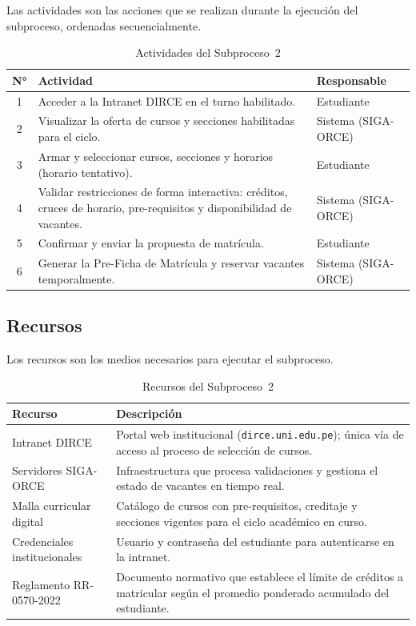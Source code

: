 Las actividades son las acciones que se realizan durante la ejecución
del subproceso, ordenadas secuencialmente.

\begin{table}[H]
\centering
\caption{Actividades del Subproceso~2}
\label{tab:actividades_sp2}
\renewcommand{\arraystretch}{1.3}
\begin{tabular}{|c|p{8.5cm}|p{3.5cm}|}
\hline
\textbf{N°} & \textbf{Actividad} & \textbf{Responsable} \\
\hline
1 & Acceder a la Intranet DIRCE en el turno habilitado. & Estudiante \\
\hline
2 & Visualizar la oferta de cursos y secciones habilitadas para el ciclo. & Sistema (SIGA-ORCE) \\
\hline
3 & Armar y seleccionar cursos, secciones y horarios (horario tentativo). & Estudiante \\
\hline
4 & Validar restricciones de forma interactiva: créditos, cruces de
    horario, pre-requisitos y disponibilidad de vacantes. & Sistema (SIGA-ORCE) \\
\hline
5 & Confirmar y enviar la propuesta de matrícula. & Estudiante \\
\hline
6 & Generar la Pre-Ficha de Matrícula y reservar vacantes temporalmente. & Sistema (SIGA-ORCE) \\
\hline
\end{tabular}
\end{table}

\subsection{Recursos}

Los recursos son los medios necesarios para ejecutar el subproceso.

\begin{table}[H]
\centering
\caption{Recursos del Subproceso~2}
\label{tab:recursos_sp2}
\renewcommand{\arraystretch}{1.3}
\begin{tabular}{|p{4cm}|p{9.5cm}|}
\hline
\textbf{Recurso} & \textbf{Descripción} \\
\hline
Intranet DIRCE &
  Portal web institucional (\texttt{dirce.uni.edu.pe}); única vía de
  acceso al proceso de selección de cursos. \\
\hline
Servidores SIGA-ORCE &
  Infraestructura que procesa validaciones y gestiona el estado de
  vacantes en tiempo real. \\
\hline
Malla curricular digital &
  Catálogo de cursos con pre-requisitos, creditaje y secciones vigentes
  para el ciclo académico en curso. \\
\hline
Credenciales institucionales &
  Usuario y contraseña del estudiante para autenticarse en la intranet. \\
\hline
Reglamento RR-0570-2022 &
  Documento normativo que establece el límite de créditos a matricular
  según el promedio ponderado acumulado del estudiante. \\
\hline
\end{tabular}
\end{table}

